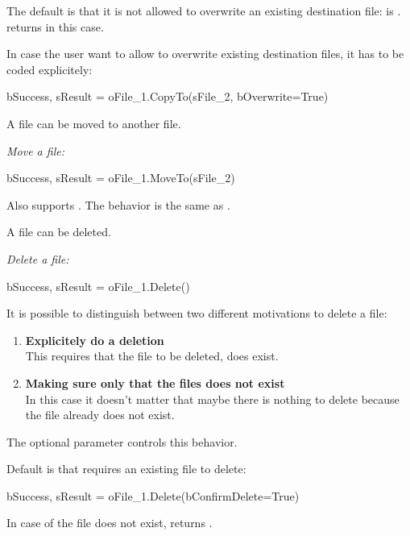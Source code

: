 The default is that it is not allowed to overwrite an existing destination file:  is .  returns
 in this case.

In case the user want to allow  to overwrite existing destination files, it has to be coded explicitely:

\begin{pythoncode}
bSuccess, sResult = oFile_1.CopyTo(sFile_2, bOverwrite=True)
\end{pythoncode}

A file can be moved to another file.

\textit{Move a file:}

\begin{pythoncode}
bSuccess, sResult = oFile_1.MoveTo(sFile_2)
\end{pythoncode}

Also  supports . The behavior is the same as .

A file can be deleted.

\textit{Delete a file:}

\begin{pythoncode}
bSuccess, sResult = oFile_1.Delete()
\end{pythoncode}

It is possible to distinguish between two different motivations to delete a file:

\begin{enumerate}
   \item \textbf{Explicitely do a deletion}\\
         This requires that the file to be deleted, does exist.
   \item \textbf{Making sure only that the files does not exist}\\
         In this case it doesn't matter that maybe there is nothing to delete because the file already does not exist.
\end{enumerate}

The optional parameter  controls this behavior.

Default is that  requires an existing file to delete:

\begin{pythoncode}
bSuccess, sResult = oFile_1.Delete(bConfirmDelete=True)
\end{pythoncode}

In case of the file does not exist,  returns .

